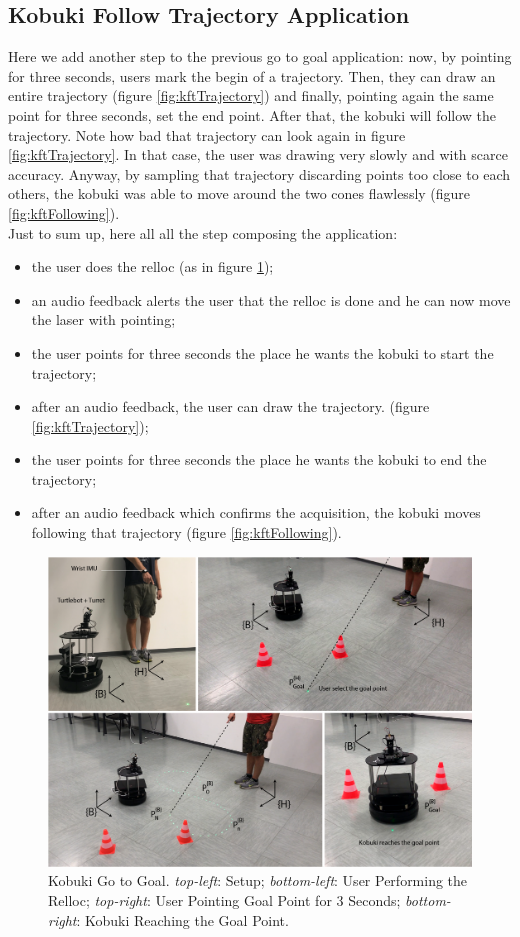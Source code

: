 \subsection{Kobuki Follow Trajectory Application}
Here we add another step to the previous go to goal application: now, by pointing for three seconds, users mark the begin of a trajectory. Then, they can draw an entire trajectory (figure \ref{fig:kftTrajectory}) and finally, pointing again the same point for three seconds, set the end point. After that, the kobuki will follow the trajectory. Note how bad that trajectory can look again in figure \ref{fig:kftTrajectory}. In that case, the user was drawing very slowly and with scarce accuracy. Anyway, by sampling that trajectory discarding points too close to each others, the kobuki was able to move around the two cones flawlessly (figure \ref{fig:kftFollowing}).\\
Just to sum up, here all all the step composing the application:
\begin{itemize}
    \item the user does the \ac{relloc} (as in figure \ref{fig:kgtgDemo1});
    \item an audio feedback alerts the user that the \ac{relloc} is done and he can now move the laser with pointing;
    \item the user points for three seconds the place he wants the kobuki to start the trajectory;
    \item after an audio feedback, the user can draw the trajectory. (figure \ref{fig:kftTrajectory});
    \item the user points for three seconds the place he wants the kobuki to end the trajectory;
    \item after an audio feedback which confirms the acquisition, the kobuki moves following that trajectory (figure \ref{fig:kftFollowing}).
\end{itemize}
\begin{figure}
	\centering
	\includegraphics[width=\textwidth]{img/kgtgDemo1.png}%
	\caption[Kobuki Go to Goal]{Kobuki Go to Goal. \emph{top-left}: Setup; \emph{bottom-left}: User Performing the Relloc; \emph{top-right}: User Pointing Goal Point for 3 Seconds; \emph{bottom-right}: Kobuki Reaching the Goal Point.}
	\label{fig:kgtgDemo1}
\end{figure}
